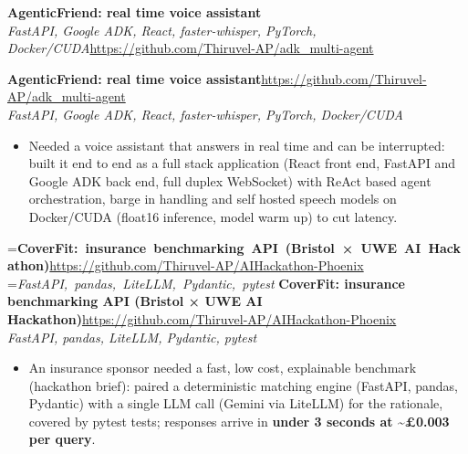 \documentclass[a4paper,11pt]{article}
\newcommand{\project}[3]{%
  \textbf{#1}\hfill#3\\ {\color{muted}\small\textit{#2}}\par}
\newcommand{\gap}{\vspace{5pt}}
\newcommand{\num}[1]{\textbf{#1}}   %
\begin{document}
\else
\textbf{AgenticFriend: real time voice assistant}\\ {\color{muted}\small\textit{FastAPI, Google ADK, React, faster-whisper, PyTorch, Docker/CUDA}}\hfill{\small\url{https://github.com/Thiruvel-AP/adk_multi-agent}}\par
\fi
\else
\project{AgenticFriend: real time voice assistant}{FastAPI, Google ADK, React, faster-whisper, PyTorch, Docker/CUDA}{\url{https://github.com/Thiruvel-AP/adk_multi-agent}}
\fi
\begin{itemize}
  \item Needed a voice assistant that answers in real time and can be interrupted: built it end to end as a full stack application (React front end, FastAPI and Google ADK back end, full duplex WebSocket) with ReAct based agent orchestration, barge in handling and self hosted speech models on Docker/CUDA (float16 inference, model warm up) to cut latency.
\end{itemize}
\gap
{}
=\hbox{\textbf{CoverFit: insurance benchmarking API (Bristol × UWE AI Hackathon)}\hspace{1em}\url{https://github.com/Thiruvel-AP/AIHackathon-Phoenix}}%
=\hbox{{\small\textit{FastAPI, pandas, LiteLLM, Pydantic, pytest}}}%
\ifdim\wd0>\linewidth
\ifdim\wd2>\linewidth
\textbf{CoverFit: insurance benchmarking API (Bristol × UWE AI Hackathon)}\\ {\color{muted}\small\textit{FastAPI, pandas, LiteLLM, Pydantic, pytest}}\\ \hfill{\small\url{https://github.com/Thiruvel-AP/AIHackathon-Phoenix}}\par
\else
\textbf{CoverFit: insurance benchmarking API (Bristol × UWE AI Hackathon)}\\ {\color{muted}\small\textit{FastAPI, pandas, LiteLLM, Pydantic, pytest}}\hfill{\small\url{https://github.com/Thiruvel-AP/AIHackathon-Phoenix}}\par
\fi
\else
\project{CoverFit: insurance benchmarking API (Bristol × UWE AI Hackathon)}{FastAPI, pandas, LiteLLM, Pydantic, pytest}{\url{https://github.com/Thiruvel-AP/AIHackathon-Phoenix}}
\fi
\begin{itemize}
  \item An insurance sponsor needed a fast, low cost, explainable benchmark (hackathon brief): paired a deterministic matching engine (FastAPI, pandas, Pydantic) with a single LLM call (Gemini via LiteLLM) for the rationale, covered by pytest tests; responses arrive in \num{under 3 seconds at \textasciitilde{}£0.003 per query}.
\end{itemize}
\end{document}
